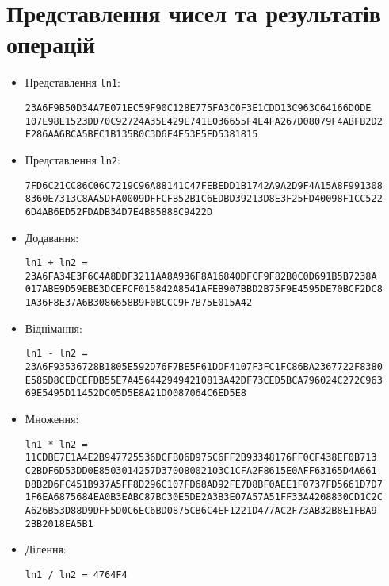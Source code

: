 \documentclass{article}
\begin{document}
\section{Представлення чисел та результатів операцій}

\begin{itemize}
\item Представлення \texttt{ln1}:
\begin{verbatim}
23A6F9B50D34A7E071EC59F90C128E775FA3C0F3E1CDD13C963C64166D0DE
107E98E1523DD70C92724A35E429E741E036655F4E4FA267D08079F4ABFB2D2
F286AA6BCA5BFC1B135B0C3D6F4E53F5ED5381815
\end{verbatim}

\item Представлення \texttt{ln2}:
\begin{verbatim}
7FD6C21CC86C06C7219C96A88141C47FEBEDD1B1742A9A2D9F4A15A8F991308
8360E7313C8AA5DFA0009DFFCFB52B1C6EDBD39213D8E3F25FD40098F1CC522
6D4AB6ED52FDADB34D7E4B85888C9422D
\end{verbatim}

\item Додавання:
\begin{verbatim}
ln1 + ln2 = 23A6FA34E3F6C4A8DDF3211AA8A936F8A16840DFCF9F82B0C0D691B5B7238A
017ABE9D59EBE3DCEFCF015842A8541AFEB907BBD2B75F9E4595DE70BCF2DC8
1A36F8E37A6B3086658B9F0BCCC9F7B75E015A42
\end{verbatim}

\item Віднімання:
\begin{verbatim}
ln1 - ln2 = 23A6F93536728B1805E592D76F7BE5F61DDF4107F3FC1FC86BA2367722F8380
E585D8CEDCEFDB55E7A4564429494210813A42DF73CED5BCA796024C272C963
69E5495D11452DC05D5E8A21D0087064C6ED5E8
\end{verbatim}

\item Множення:
\begin{verbatim}
ln1 * ln2 = 11CDBE7E1A4E2B947725536DCFB06D975C6FF2B93348176FF0CF438EF0B713
C2BDF6D53DD0E8503014257D37008002103C1CFA2F8615E0AFF63165D4A661
D8B2D6FC451B937A5FF8D296C107FD68AD92FE7D8BF0AEE1F0737FD5661D7D7
1F6EA6875684EA0B3EABC87BC30E5DE2A3B3E07A57A51FF33A4208830CD1C2C
A626B53D88D9DFF5D0C6EC6BD0875CB6C4EF1221D477AC2F73AB32B8E1FBA9
2BB2018EA5B1
\end{verbatim}

\item Ділення:
\begin{verbatim}
ln1 / ln2 = 4764F4
\end{verbatim}


\end{itemize}
\end{document}
